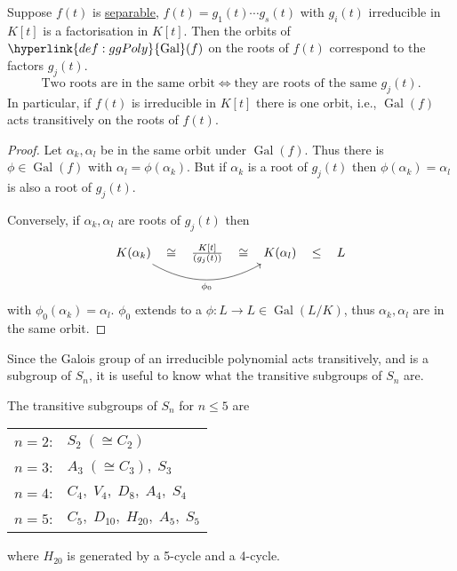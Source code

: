 \documentclass{article}
\DeclareMathOperator{\Gal}{Gal}
\begin{document}
\begin{nlemma}\label{lem:3.6}
    Suppose $f(t)$ is \hyperlink{def:separablePoly}{separable}, $f(t) = g_1(t) \dotsm g_s(t)$ with $g_i(t)$ irreducible in $K[t]$ is a factorisation in $K[t]$.
    Then the orbits of $\hyperlink{def:ggPoly}{\Gal}(f)$ on the roots of $f(t)$ correspond to the factors $g_j(t)$.
    \begin{equation*}
        \text{Two roots are in the same orbit} \iff \text{they are roots of the same } g_j(t).
    \end{equation*}
    In particular, if $f(t)$ is irreducible in $K[t]$ there is one orbit, i.e., $\Gal(f)$ acts transitively on the roots of $f(t)$.
\end{nlemma}
\begin{proof}
    Let $\alpha_k, \alpha_l$ be in the same orbit under $\Gal(f)$.
    Thus there is $\phi \in \Gal(f)$ with $\alpha_l = \phi(\alpha_k)$.
    But if $\alpha_k$ is a root of $g_j(t)$ then $\phi(\alpha_k) = \alpha_l$ is also a root of $g_j(t)$.

    Conversely, if $\alpha_k, \alpha_l$ are roots of $g_j(t)$ then
    \begin{equation*}
        \begin{tikzcd}
            K(\alpha_k) \rar[phantom,"\cong"] \ar[rr,bend right, "\phi_0"'] & \frac{K[t]}{(g_j(t))} \rar[phantom,"\cong"] & K(\alpha_l) \rar[phantom,"\leq"]& L
        \end{tikzcd}
    \end{equation*}
    with $\phi_0(\alpha_k) = \alpha_l$.
    $\phi_0$ extends to a $\phi:L \to L \in \Gal(L/K)$, thus $\alpha_k, \alpha_l$ are in the same orbit.
\end{proof}

Since the Galois group of an irreducible polynomial acts transitively, and is a subgroup of $S_n$, it is useful to know what the transitive subgroups of $S_n$ are.

\begin{nlemma}\label{lem:3.7}
    The transitive subgroups of $S_n$ for $n \leq 5$ are
    \begin{center}
        \begin{tabular}{rl}
            $n=2$:  & $S_2 \; (\cong C_2)$ \\
            $n=3$:  & $A_3 \; (\cong C_3), \; S_3$ \\
            $n=4$:  & $C_4, \; V_4, \; D_8, \; A_4, \; S_4$ \\
            $n=5$:  & $C_5, \; D_{10}, \; H_{20}, \; A_5, \; S_5$\\
        \end{tabular}
    \end{center}
    where $H_{20}$ is generated by a 5-cycle and a 4-cycle.
\end{nlemma}
\end{document}
